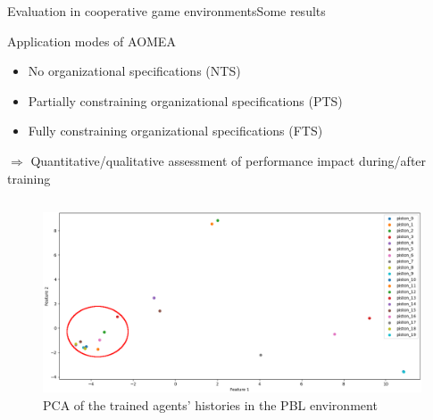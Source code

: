 \begin{frame}{Evaluation in cooperative game environments}{Some results}

    \begin{block}{Application modes of AOMEA}
        \begin{itemize}
            \item No organizational specifications (NTS)
            \item Partially constraining organizational specifications (PTS)
            \item Fully constraining organizational specifications (FTS)
        \end{itemize}
    \end{block}

    $\Longrightarrow$ Quantitative/qualitative assessment of performance impact during/after training

    \begin{columns}

        \begin{column}{0.5\textwidth}
            \begin{figure}[h!]
                \centering
                \includegraphics[width=\textwidth]{figures/prahom_pca_analysis.png}
                \caption*{PCA of the trained agents' histories in the PBL environment}
                \label{fig:prahom_pca_analysis}
            \end{figure}
        \end{column}

        \hspace{1ex}


\end{columns}
\end{frame}
